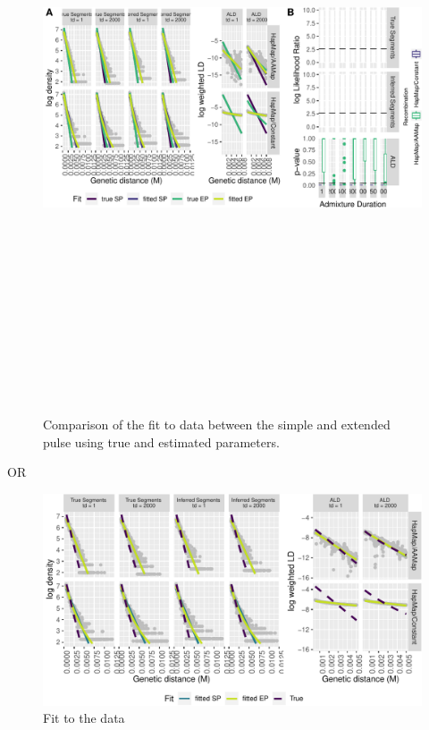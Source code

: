 \documentclass[11pt]{article}
\begin{document}
\begin{figure}
\centering
\includegraphics[width=16cm,height=18cm,keepaspectratio]{ATE_Revisions_files/figure-latex/figResult2_2and3_supplement-1.pdf}
\caption{\label{fig:fig3_2} Comparison of the fit to data between the simple and extended pulse using true and estimated parameters. }
\end{figure}

OR

\begin{figure}
\centering
\includegraphics{ATE_Revisions_files/figure-latex/figResult2_2_Supplements-1.pdf}
\caption{\label{fig:figResult3_2_Supplements} Fit to the data}
\end{figure}
\end{document}
